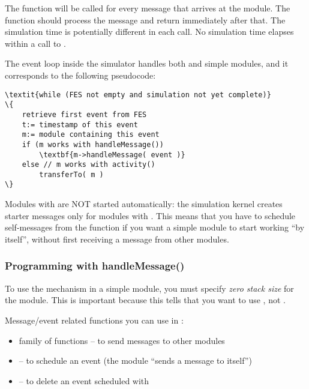 The  function will be called for every message
that arrives at the module. The function should process the message
and return immediately after that. The simulation time is potentially
different in each call. No simulation time elapses within a call
to .

The event loop inside the simulator handles both 
and  simple modules, and it corresponds
to the following pseudocode:

\begin{Verbatim}[commandchars=\\\{\}]
\textit{while (FES not empty and simulation not yet complete)}
\{
    retrieve first event from FES
    t:= timestamp of this event
    m:= module containing this event
    if (m works with handleMessage())
        \textbf{m->handleMessage( event )}
    else // m works with activity()
        transferTo( m )
\}
\end{Verbatim}

Modules with  are NOT started automatically:
the simulation kernel creates starter messages
only for modules with . This means that you have to
schedule self-messages from the
 function if you want a 
simple module to start working ``by itself'', without first receiving
a message from other modules.


\subsubsection{Programming with handleMessage()}
\label{sec:simple-modules:handlemessage:programming}

To use the  mechanism in a simple module, you must
specify \textit{zero stack size} for the module.
This is important because this tells {\opp} that you want to use
, not .

Message/event related functions you can use in :

\begin{itemize}
  \item {} family of functions -- to send messages to other modules
  \item {} -- to schedule an event (the module ``sends a message to itself'')
  \item {} -- to delete an event scheduled with 
\end{itemize}

